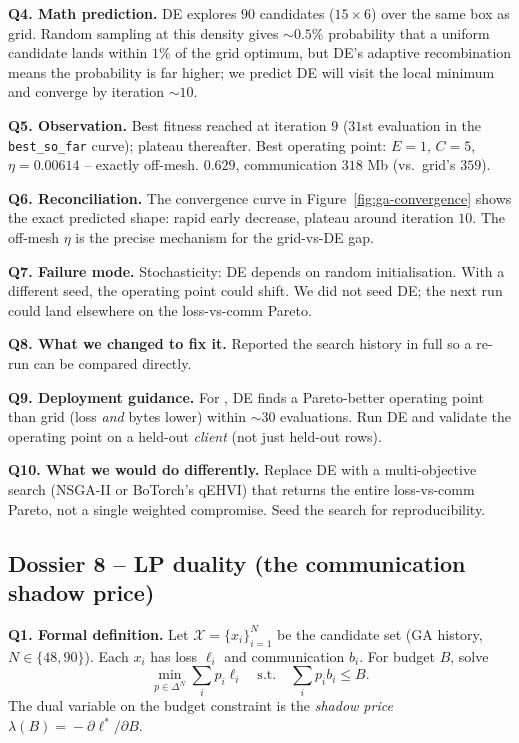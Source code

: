 \textbf{Q4. Math prediction.}
DE explores $90$ candidates ($15 \times 6$) over the same box as grid.
Random sampling at this density gives $\sim$$0.5\%$ probability that
a uniform candidate lands within $1\%$ of the grid optimum, but DE's
adaptive recombination means the probability is far higher; we
predict DE will visit the local minimum and converge by iteration
$\sim$$10$.

\textbf{Q5. Observation.}
Best fitness reached at iteration $9$ ($31$st evaluation in the
\texttt{best\_so\_far} curve); plateau thereafter. Best operating
point: $E\!=\!1$, $C\!=\!5$, $\eta\!=\!0.00614$ -- exactly off-mesh.
\auprc{} $0.629$, communication $318$ Mb (vs.\ grid's $359$).

\textbf{Q6. Reconciliation.}
The convergence curve in Figure~\ref{fig:ga-convergence} shows the
exact predicted shape: rapid early decrease, plateau around iteration
$10$. The off-mesh $\eta$ is the precise mechanism for the
grid-vs-DE \auprc{} gap.

\textbf{Q7. Failure mode.}
Stochasticity: DE depends on random initialisation. With a different
seed, the operating point could shift. We did not seed DE; the next
run could land elsewhere on the loss-vs-comm Pareto.

\textbf{Q8. What we changed to fix it.}
Reported the search history in full so a re-run can be compared
directly.

\textbf{Q9. Deployment guidance.}
For \mimic{}, DE finds a Pareto-better operating point than grid
(loss \emph{and} bytes lower) within $\sim$$30$ evaluations. Run DE
and validate the operating point on a held-out \emph{client}
(not just held-out rows).

\textbf{Q10. What we would do differently.}
Replace DE with a multi-objective search (NSGA-II or BoTorch's
qEHVI) that returns the entire loss-vs-comm Pareto, not a single
weighted compromise. Seed the search for reproducibility.

\subsection{Dossier 8 -- LP duality (the communication shadow price)}
\label{sec:dossier-lp}

\textbf{Q1. Formal definition.}
Let $\mathcal{X} \!=\! \{x_i\}_{i=1}^{N}$ be the candidate set
(GA history, $N\!\in\!\{48,90\}$). Each $x_i$ has loss $\ell_i$ and
communication $b_i$. For budget $B$, solve
\[
\min_{p \in \Delta^{N}} \sum_i p_i \ell_i \quad \text{s.t.}
\quad \sum_i p_i b_i \leq B.
\]
The dual variable on the budget constraint is the \emph{shadow price}
$\lambda(B) \!=\! -\partial \ell^* / \partial B$.

